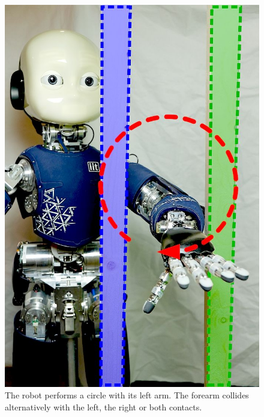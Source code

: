 	\begin{figure}[t]
		\begin{minipage}{.43\linewidth}
			\centering
			\includegraphics[width =.94\linewidth]{images/iCubParis02_Double_Contact}
			\caption{The robot performs a circle with its left arm. 
			The forearm collides alternatively with the left, the right or both contacts.}
			\label{fig:exp3:icuparis_experiment_bars}
		\end{minipage}	
		\hfill
		\begin{minipage}{.52\linewidth}
			\centering

\end{minipage}
\end{figure}

